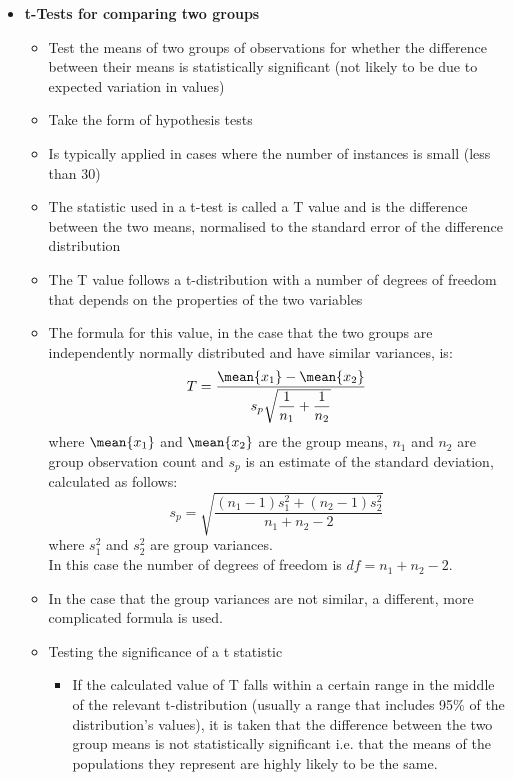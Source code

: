 \begin{itemize}
\item \textbf{t-Tests for comparing two groups}
  \begin{itemize}
  \item Test the means of two groups of observations for whether the difference between their means is statistically significant (not likely to be due to expected variation in values)
  \item Take the form of hypothesis tests
  \item Is typically applied in cases where the number of instances is small (less than 30)
  \item The statistic used in a t-test is called a T value and is the difference between the two means, normalised to the standard error of the difference distribution
  \item The T value follows a t-distribution with a number of degrees of freedom that depends on the properties of the two variables 
  \item The formula for this value, in the case that the two groups are independently normally distributed and have similar variances, is: \\
    $$ T = \dfrac{\mean{x_1} - \mean{x_2}}{s_p\sqrt{\dfrac{1}{n_1}+\dfrac{1}{n_2}}} $$
    where $\mean{x_1}$ and $\mean{x_2}$ are the group means, $n_1$ and $n_2$ are group observation count and $s_p$ is an estimate of the standard deviation, calculated as follows: \\
    $$ s_p=\sqrt{\dfrac{(n_1-1)s_1^2+(n_2-1)s_2^2}{n_1+n_2-2}} $$
    where $s_1^2$ and $s_2^2$ are group variances. \\
    In this case the number of degrees of freedom is $df = n_1+n_2-2$.
  \item In the case that the group variances are not similar, a different, more complicated formula is used. 

  \item Testing the significance of a t statistic

    \begin{itemize}
      \item If the calculated value of T falls within a certain range in the middle of the relevant t-distribution (usually a range that includes 95\% of the distribution's values), it is taken that the difference between the two group means is not statistically significant i.e. that the means of the populations they represent are highly likely to be the same.


\end{itemize}
\end{itemize}
\end{itemize}
